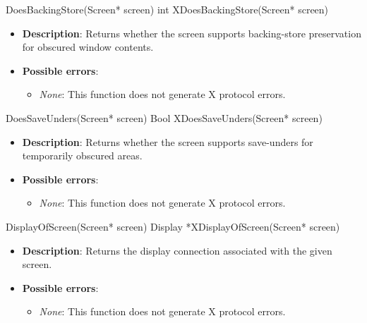 \documentclass{report}
\begin{document}
\begin{itemize}
        \begin{cppcode}
            DoesBackingStore(Screen* screen)
            int XDoesBackingStore(Screen* screen)
        \end{cppcode}
        \begin{itemize}
            \item \textbf{Description}: Returns whether the screen supports backing-store preservation for obscured window contents.
            \item \textbf{Possible errors}:
                \begin{itemize}
                    \item \textit{None}: This function does not generate X protocol errors.
                \end{itemize}
        \end{itemize}

        \begin{cppcode}
            DoesSaveUnders(Screen* screen)
            Bool XDoesSaveUnders(Screen* screen)
        \end{cppcode}
        \begin{itemize}
            \item \textbf{Description}: Returns whether the screen supports save-unders for temporarily obscured areas.
            \item \textbf{Possible errors}:
                \begin{itemize}
                    \item \textit{None}: This function does not generate X protocol errors.
                \end{itemize}
        \end{itemize}

        \begin{cppcode}
            DisplayOfScreen(Screen* screen)
            Display *XDisplayOfScreen(Screen* screen)
        \end{cppcode}
        \begin{itemize}
            \item \textbf{Description}: Returns the display connection associated with the given screen.
            \item \textbf{Possible errors}:
                \begin{itemize}
                    \item \textit{None}: This function does not generate X protocol errors.
                \end{itemize}
        \end{itemize}


\end{itemize}
\end{document}
